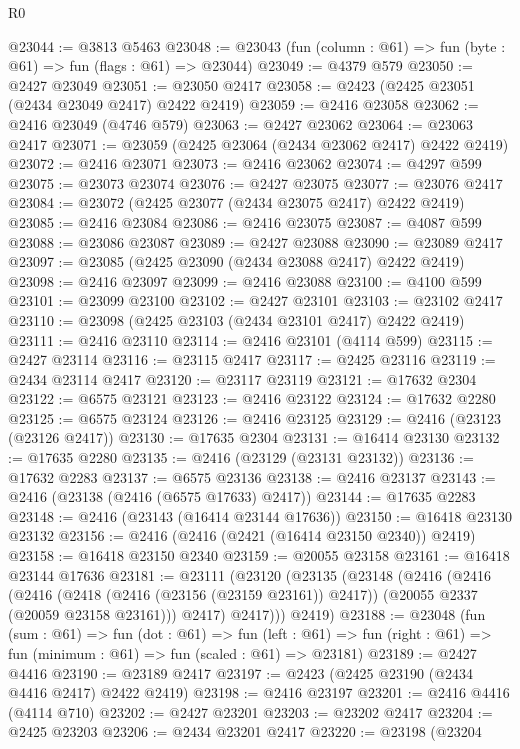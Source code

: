 \begin{lexlean}{R0}
\begin{coremodule}
@23044 := @3813 @5463
@23048 := @23043 (fun (column : @61) => fun (byte : @61) => fun (flags : @61) => @23044)
@23049 := @4379 @579
@23050 := @2427 @23049
@23051 := @23050 @2417
@23058 := @2423 (@2425 @23051 (@2434 @23049 @2417) @2422 @2419)
@23059 := @2416 @23058
@23062 := @2416 @23049 (@4746 @579)
@23063 := @2427 @23062
@23064 := @23063 @2417
@23071 := @23059 (@2425 @23064 (@2434 @23062 @2417) @2422 @2419)
@23072 := @2416 @23071
@23073 := @2416 @23062
@23074 := @4297 @599
@23075 := @23073 @23074
@23076 := @2427 @23075
@23077 := @23076 @2417
@23084 := @23072 (@2425 @23077 (@2434 @23075 @2417) @2422 @2419)
@23085 := @2416 @23084
@23086 := @2416 @23075
@23087 := @4087 @599
@23088 := @23086 @23087
@23089 := @2427 @23088
@23090 := @23089 @2417
@23097 := @23085 (@2425 @23090 (@2434 @23088 @2417) @2422 @2419)
@23098 := @2416 @23097
@23099 := @2416 @23088
@23100 := @4100 @599
@23101 := @23099 @23100
@23102 := @2427 @23101
@23103 := @23102 @2417
@23110 := @23098 (@2425 @23103 (@2434 @23101 @2417) @2422 @2419)
@23111 := @2416 @23110
@23114 := @2416 @23101 (@4114 @599)
@23115 := @2427 @23114
@23116 := @23115 @2417
@23117 := @2425 @23116
@23119 := @2434 @23114 @2417
@23120 := @23117 @23119
@23121 := @17632 @2304
@23122 := @6575 @23121
@23123 := @2416 @23122
@23124 := @17632 @2280
@23125 := @6575 @23124
@23126 := @2416 @23125
@23129 := @2416 (@23123 (@23126 @2417))
@23130 := @17635 @2304
@23131 := @16414 @23130
@23132 := @17635 @2280
@23135 := @2416 (@23129 (@23131 @23132))
@23136 := @17632 @2283
@23137 := @6575 @23136
@23138 := @2416 @23137
@23143 := @2416 (@23138 (@2416 (@6575 @17633) @2417))
@23144 := @17635 @2283
@23148 := @2416 (@23143 (@16414 @23144 @17636))
@23150 := @16418 @23130 @23132
@23156 := @2416 (@2416 (@2421 (@16414 @23150 @2340)) @2419)
@23158 := @16418 @23150 @2340
@23159 := @20055 @23158
@23161 := @16418 @23144 @17636
@23181 := @23111
    (@23120
      (@23135
        (@23148
          (@2416
            (@2416
              (@2416
                (@2418 (@2416 (@23156 (@23159 @23161)) @2417))
                (@20055 @2337 (@20059 @23158 @23161)))
              @2417)
            @2417)))
      @2419)
@23188 := @23048
    (fun (sum : @61) =>
    fun (dot : @61) =>
    fun (left : @61) => fun (right : @61) => fun (minimum : @61) => fun (scaled : @61) => @23181)
@23189 := @2427 @4416
@23190 := @23189 @2417
@23197 := @2423 (@2425 @23190 (@2434 @4416 @2417) @2422 @2419)
@23198 := @2416 @23197
@23201 := @2416 @4416 (@4114 @710)
@23202 := @2427 @23201
@23203 := @23202 @2417
@23204 := @2425 @23203
@23206 := @2434 @23201 @2417
@23220 := @23198
    (@23204

\end{coremodule}
\end{lexlean}
